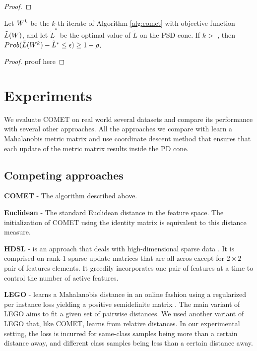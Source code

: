 \documentclass{article}
\begin{document}
{\begin{proof}


\end{proof}

\begin{theorem}
Let ${W}^k$ be the $k$-th iterate of Algorithm \ref{alg:comet} with objective function $\tilde{L}({W})$, and let $\tilde{L}^*$ be the optimal value of $\tilde{L}$ on the PSD cone.
If $k >$ , then $Prob(\tilde{L}({W}^k) - \tilde{L}^* \leq \epsilon) \geq 1-\rho$.
\end{theorem}
\begin{proof}
proof here
\end{proof}
\section{Experiments}
We evaluate COMET on real world several datasets and compare its performance with several other approaches. All the approaches we compare with learn a Mahalanobis metric matrix and use coordinate descent method that ensures that each update of the metric matrix results inside the PD cone. 



\subsection{Competing approaches}



\textbf{COMET} - The algorithm described above.

\textbf{Euclidean} - The standard Euclidean distance in the feature space. The initialization of COMET using the identity matrix is equivalent to this distance measure.

\textbf{HDSL} - is an approach that deals with high-dimensional sparse data \cite{hdsl}. It is comprised on rank-1 sparse update matrices that are all zeros except for $2\times2$ pair of features elements. It greedily incorporates one pair of features at a time to control the number of active features.

\textbf{LEGO} - learns a Mahalanobis distance in an online fashion using a regularized per instance loss yielding a positive semidefinite matrix \cite{lego}. The main variant of LEGO aims to fit a given set of pairwise distances. We used another variant of LEGO that, like COMET, learns from relative distances. In our experimental setting, the loss is incurred for same-class samples being more than a certain distance away, and different class samples being less than a certain distance away.

}
\end{document}
